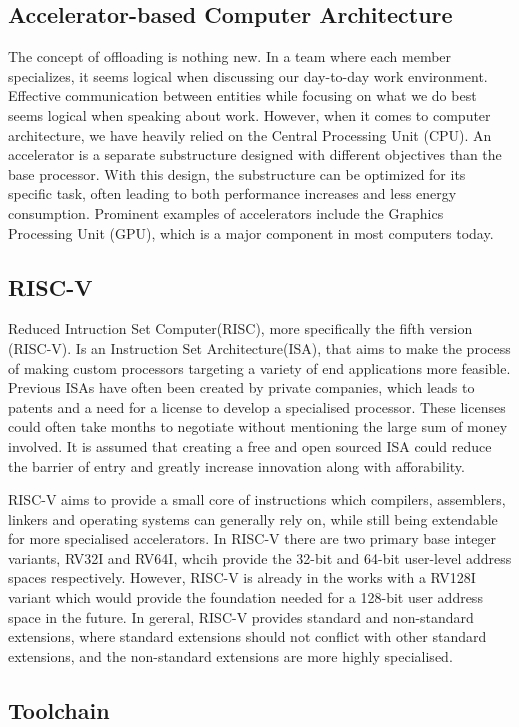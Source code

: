 \subsection{Accelerator-based Computer Architecture}
The concept of offloading is nothing new.
In a team where each member specializes, it seems logical when discussing our day-to-day work environment.
Effective communication between entities while focusing on what we do best seems logical when speaking about work.
However, when it comes to computer architecture, we have heavily relied on the Central Processing Unit (CPU).
An accelerator is a separate substructure designed with different objectives than the base processor.
With this design, the substructure can be optimized for its specific task, often leading to both performance increases and less energy consumption\cite{AA}.
Prominent examples of accelerators include the Graphics Processing Unit (GPU), which is a major component in most computers today.

\subsection{RISC-V}
Reduced Intruction Set Computer(RISC), more specifically the fifth version (RISC-V). Is an Instruction Set Architecture(ISA), that aims to make the process of
making custom processors targeting a variety of end applications more feasible. Previous ISAs have often been created by private companies, which leads to patents
and a need for a license to develop a specialised processor. These licenses could often take months to negotiate without mentioning the large sum of money involved.
It is assumed that creating a free and open sourced ISA could reduce the barrier of entry and greatly increase innovation along with afforability\cite{ISAfree}.

RISC-V aims to provide a small core of instructions which compilers, assemblers, linkers and operating systems can generally rely on, while still being extendable for more specialised
accelerators. In RISC-V there  are two primary base integer variants, RV32I and RV64I, whcih provide the 32-bit and 64-bit user-level address spaces respectively. However, RISC-V is already
in the works with a RV128I variant which would provide the foundation needed for a 128-bit user address space in the future. In gereral, RISC-V provides standard and non-standard extensions,
where standard extensions should not conflict with other standard extensions, and the non-standard extensions are more highly specialised.


\subsection{Toolchain}

